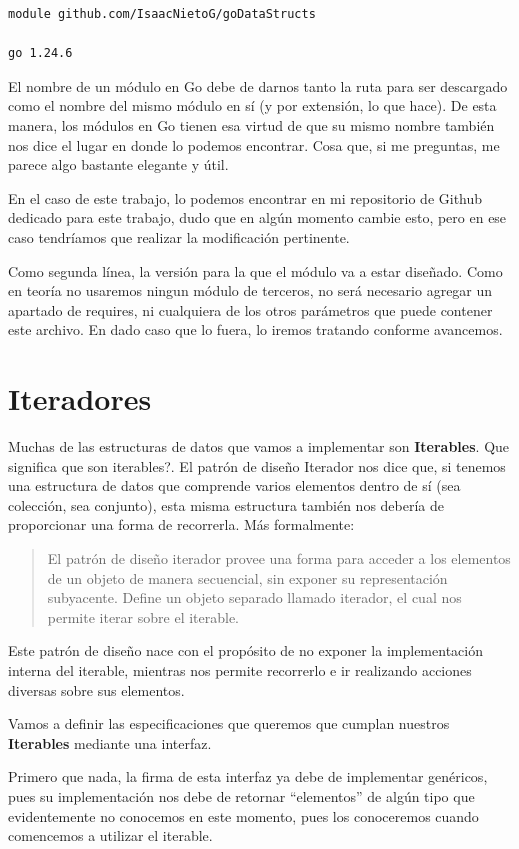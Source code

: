 \documentclass[11pt]{article}
\begin{document}
\begin{verbatim}
module github.com/IsaacNietoG/goDataStructs

go 1.24.6
\end{verbatim}

El nombre de un módulo en Go debe de darnos tanto la ruta para ser descargado como el nombre del mismo módulo en sí (y por extensión, lo que hace). De esta manera, los módulos en Go tienen esa virtud de que su mismo nombre también nos dice el lugar en donde lo podemos encontrar. Cosa que, si me preguntas, me parece algo bastante elegante y útil.

En el caso de este trabajo, lo podemos encontrar en mi repositorio de Github dedicado para este trabajo, dudo que en algún momento cambie esto, pero en ese caso tendríamos que realizar la modificación pertinente.

Como segunda línea, la versión para la que el módulo va a estar diseñado. Como en teoría no usaremos ningun módulo de terceros, no será necesario agregar un apartado de requires, ni cualquiera de los otros parámetros que puede contener este archivo. En dado caso que lo fuera, lo iremos tratando conforme avancemos.
\section{Iteradores}
\label{sec:org5f460f8}
Muchas de las estructuras de datos que vamos a implementar son \textbf{\textbf{Iterables}}. Que significa que son iterables?.
El patrón de diseño Iterador nos dice que, si tenemos una estructura de datos que comprende varios elementos dentro de sí (sea colección, sea conjunto), esta misma estructura también nos debería de proporcionar una forma de recorrerla. Más formalmente:
\begin{quote}
El patrón de diseño iterador provee una forma para acceder a los elementos de un objeto de manera secuencial, sin exponer su representación subyacente. Define un objeto separado llamado iterador, el cual nos permite iterar sobre el iterable.
\end{quote}

Este patrón de diseño nace con el propósito de no exponer la implementación interna del iterable, mientras nos permite recorrerlo e ir realizando acciones diversas sobre sus elementos.

Vamos a definir las especificaciones que queremos que cumplan nuestros \textbf{\textbf{Iterables}} mediante una interfaz.

Primero que nada, la firma de esta interfaz ya debe de implementar genéricos, pues su implementación nos debe de retornar ``elementos'' de algún tipo que evidentemente no conocemos en este momento, pues los conoceremos cuando comencemos a utilizar el iterable.
\end{document}
